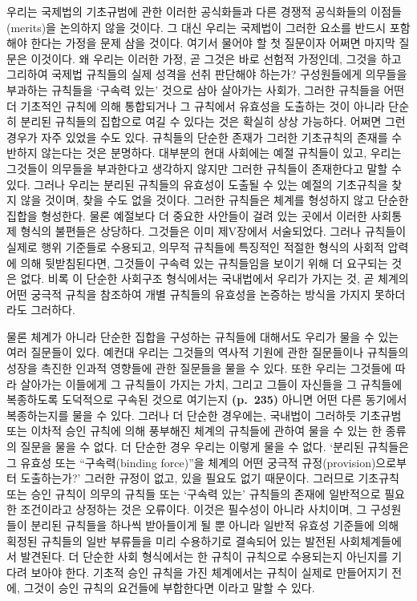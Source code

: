 우리는 국제법의 기초규범에 관한 이러한 공식화들과 다른 경쟁적 공식화들의
이점들(merits)을 논의하지 않을 것이다. 그 대신 우리는 국제법이 그러한
요소를 반드시 포함해야 한다는 가정을 문제 삼을 것이다. 여기서 물어야 할
첫 질문이자 어쩌면 마지막 질문은 이것이다. 왜 우리는 이러한
 가정, 곧 그것은 바로 선험적 가정인데, 그것을 하고 그리하여
국제법 규칙들의 실제 성격을 선취 판단해야 하는가? 구성원들에게 의무들을
부과하는 규칙들을 ‘구속력 있는’ 것으로 삼아 살아가는 사회가, 그러한
규칙들을 어떤 더 기초적인 규칙에 의해 통합되거나 그 규칙에서 유효성을
도출하는 것이 아니라 단순히 분리된 규칙들의 집합으로 여길 수 있다는 것은
확실히 상상 가능하다. 어쩌면 그런 경우가 자주 있었을 수도 있다. 규칙들의
단순한 존재가 그러한 기초규칙의 존재를 수반하지 않는다는 것은 분명하다.
대부분의 현대 사회에는 예절 규칙들이 있고, 우리는 그것들이 의무들을
부과한다고 생각하지 않지만 그러한 규칙들이 존재한다고 말할 수 있다.
그러나 우리는 분리된 규칙들의 유효성이 도출될 수 있는 예절의 기초규칙을
찾지 않을 것이며, 찾을 수도 없을 것이다. 그러한 규칙들은 체계를 형성하지
않고 단순한 집합을 형성한다. 물론 예절보다 더 중요한 사안들이 걸려 있는
곳에서 이러한 사회통제 형식의 불편들은 상당하다. 그것들은 이미 제V장에서
서술되었다. 그러나 규칙들이 실제로 행위 기준들로 수용되고, 의무적
규칙들에 특징적인 적절한 형식의 사회적 압력에 의해 뒷받침된다면,
그것들이 구속력 있는 규칙들임을 보이기 위해 더 요구되는 것은 없다. 비록
이 단순한 사회구조 형식에서는 국내법에서 우리가 가지는 것, 곧 체계의
어떤 궁극적 규칙을 참조하여 개별 규칙들의 유효성을 논증하는 방식을
가지지 못하더라도 그러하다.

물론 체계가 아니라 단순한 집합을 구성하는 규칙들에 대해서도 우리가 물을
수 있는 여러 질문들이 있다. 예컨대 우리는 그것들의 역사적 기원에 관한
질문들이나 규칙들의 성장을 촉진한 인과적 영향들에 관한 질문들을 물을 수
있다. 또한 우리는 그것들에 따라 살아가는 이들에게 그 규칙들이 가지는
가치, 그리고 그들이 자신들을 그 규칙들에 복종하도록 도덕적으로 구속된
것으로 여기는지 \textbf{(p.~235)} 아니면 어떤 다른 동기에서 복종하는지를
물을 수 있다. 그러나 더 단순한 경우에는, 국내법이 그러하듯 기초규범 또는
이차적 승인 규칙에 의해 풍부해진 체계의 규칙들에 관하여 물을 수 있는 한
종류의 질문을 물을 수 없다. 더 단순한 경우 우리는 이렇게 물을 수 없다.
‘분리된 규칙들은 그 유효성 또는 “구속력(binding force)”을 체계의 어떤
궁극적 규정(provision)으로부터 도출하는가?’ 그러한 규정이 없고, 있을
필요도 없기 때문이다. 그러므로 기초규칙 또는 승인 규칙이 의무의 규칙들
또는 ‘구속력 있는’ 규칙들의 존재에 일반적으로 필요한 조건이라고 상정하는
것은 오류이다. 이것은 필수성이 아니라 사치이며, 그 구성원들이 분리된
규칙들을 하나씩 받아들이게 될 뿐 아니라 일반적 유효성 기준들에 의해
획정된 규칙들의 일반 부류들을 미리 수용하기로 결속되어 있는 발전된
사회체계들에서 발견된다. 더 단순한 사회 형식에서는 한 규칙이 규칙으로
수용되는지 아닌지를 기다려 보아야 한다. 기초적 승인 규칙을 가진
체계에서는 규칙이 실제로 만들어지기 전에, 그것이 승인 규칙의 요건들에
부합한다면 이라고 말할 수 있다.

